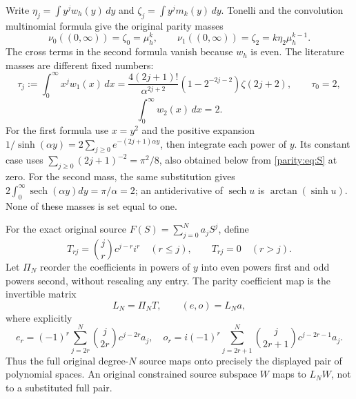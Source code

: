 Write $\eta_j=\int y^jw_h(y)\,dy$ and
$\zeta_j=\int y^jm_k(y)\,dy$. Tonelli and the convolution
multinomial formula give the original parity masses
\begin{equation}\label{parity:eq:masses}
 \nu_0((0,\infty))=\zeta_0=\mu_h^k,
 \qquad \nu_1((0,\infty))=\zeta_2=k\eta_2\mu_h^{k-1}.
\end{equation}
The cross terms in the second formula vanish because $w_h$ is
even. The literature masses are different fixed numbers:
\begin{equation}\label{parity:eq:raw-moments}
 \tau_j:=\int_0^\infty x^j w_1(x)\,dx
 =\frac{4(2j+1)!}{\alpha^{2j+2}}
        (1-2^{-2j-2})\zeta(2j+2),\qquad \tau_0=2,
\end{equation}
\[
 \int_0^\infty w_2(x)\,dx=2.
\]
For the first formula use $x=y^2$ and the positive expansion
$1/\sinh(\alpha y)=2\sum_{j\geq0}e^{-(2j+1)\alpha y}$,
then integrate each power of $y$. Its constant case uses
$\sum_{j\geq0}(2j+1)^{-2}=\pi^2/8$, also obtained below from
\eqref{parity:eq:S} at zero. For the second mass, the same substitution
gives $2\int_0^\infty\operatorname{sech}(\alpha y)dy=\pi/\alpha=2$;
an antiderivative of $\operatorname{sech} u$ is
$\arctan(\sinh u)$. None of these masses is set equal to one.

For the exact original source $F(S)=\sum_{j=0}^Na_jS^j$, define
\[
 T_{rj}=\binom jr c^{j-r}i^r\quad(r\leq j),\qquad T_{rj}=0\quad(r>j).
\]
Let $\Pi_N$ reorder the coefficients in powers of $y$ into even
powers first and odd powers second, without rescaling any entry.
The parity coefficient map is the invertible matrix
\begin{equation}\label{parity:eq:source-map}
 L_N=\Pi_NT,\qquad (e,o)=L_Na,
\end{equation}
where explicitly
\[
 e_r=(-1)^r\sum_{j=2r}^N\binom j{2r}c^{j-2r}a_j,
 \quad
 o_r=i(-1)^r\sum_{j=2r+1}^N\binom j{2r+1}c^{j-2r-1}a_j.
\]
Thus the full original degree-$N$ source maps onto precisely the
displayed pair of polynomial spaces. An original constrained
source subspace $W$ maps to $L_NW$, not to a substituted full pair.

